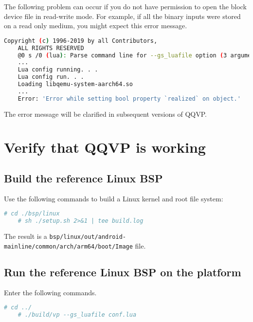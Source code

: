 The following problem can occur if you do not have permission to open the block device file in read-write mode. For example, if all the binary inputs were stored on a read only medium, you might expect this error message.

\small
\begin{lstlisting}[language=bash]
    Copyright (c) 1996-2019 by all Contributors,
    ALL RIGHTS RESERVED
    @0 s /0 (lua): Parse command line for --gs_luafile option (3 arguments)
    ...
    Lua config running. . .
    Lua config run. . .
    Loading libqemu-system-aarch64.so
    ...
    Error: 'Error while setting bool property `realized` on object.'
\end{lstlisting}
\normalsize

\note The error message will be clarified in subsequent versions of QQVP.


\clearpage
\section{Verify that QQVP is working}

\subsection{Build the reference Linux BSP}

Use the following commands to build a Linux kernel and root file system:

\small
\begin{lstlisting}[language=bash]
    # cd ./bsp/linux
    # sh ./setup.sh 2>&1 | tee build.log
\end{lstlisting}
\normalsize

The result is a {\small{\lstinline!bsp/linux/out/android-mainline/common/arch/arm64/boot/Image!}} file.



\subsection{Run the reference Linux BSP on the platform}

Enter the following commands.

\small
\begin{lstlisting}[language=bash]
    # cd ../
    # ./build/vp --gs_luafile conf.lua
\end{lstlisting}
\normalsize

